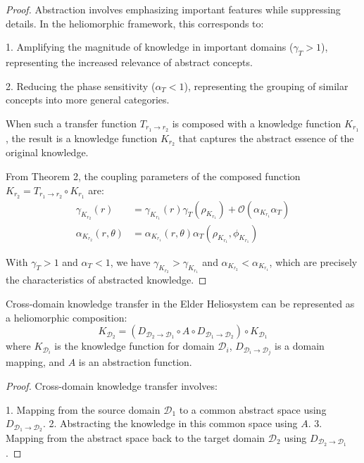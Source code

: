 \begin{definition}
\begin{enumerate}
\begin{definition}
\begin{definition}
\begin{proof}
Abstraction involves emphasizing important features while suppressing details. In the heliomorphic framework, this corresponds to:

1. Amplifying the magnitude of knowledge in important domains ($\gamma_T > 1$), representing the increased relevance of abstract concepts.

2. Reducing the phase sensitivity ($\alpha_T < 1$), representing the grouping of similar concepts into more general categories.

When such a transfer function $T_{r_1 \to r_2}$ is composed with a knowledge function $K_{r_1}$, the result is a knowledge function $K_{r_2}$ that captures the abstract essence of the original knowledge.

From Theorem 2, the coupling parameters of the composed function $K_{r_2} = T_{r_1 \to r_2} \circ K_{r_1}$ are:
\begin{align}
\gamma_{K_{r_2}}(r) &= \gamma_{K_{r_1}}(r)\gamma_T(\rho_{K_{r_1}}) + \mathcal{O}(\alpha_{K_{r_1}}\alpha_T)\\
\alpha_{K_{r_2}}(r,\theta) &= \alpha_{K_{r_1}}(r,\theta)\alpha_T(\rho_{K_{r_1}},\phi_{K_{r_1}})
\end{align}

With $\gamma_T > 1$ and $\alpha_T < 1$, we have $\gamma_{K_{r_2}} > \gamma_{K_{r_1}}$ and $\alpha_{K_{r_2}} < \alpha_{K_{r_1}}$, which are precisely the characteristics of abstracted knowledge.
\end{proof}

\begin{theorem}
Cross-domain knowledge transfer in the Elder Heliosystem can be represented as a heliomorphic composition:
\begin{equation}
K_{\mathcal{D}_2} = (D_{\mathcal{D}_2 \to \mathcal{D}_1} \circ A \circ D_{\mathcal{D}_1 \to \mathcal{D}_2}) \circ K_{\mathcal{D}_1}
\end{equation}
where $K_{\mathcal{D}_i}$ is the knowledge function for domain $\mathcal{D}_i$, $D_{\mathcal{D}_i \to \mathcal{D}_j}$ is a domain mapping, and $A$ is an abstraction function.
\end{theorem}

\begin{proof}
Cross-domain knowledge transfer involves:

1. Mapping from the source domain $\mathcal{D}_1$ to a common abstract space using $D_{\mathcal{D}_1 \to \mathcal{D}_2}$.
2. Abstracting the knowledge in this common space using $A$.
3. Mapping from the abstract space back to the target domain $\mathcal{D}_2$ using $D_{\mathcal{D}_2 \to \mathcal{D}_1}$.


\end{proof}
\end{definition}
\end{definition}
\end{enumerate}
\end{definition}
